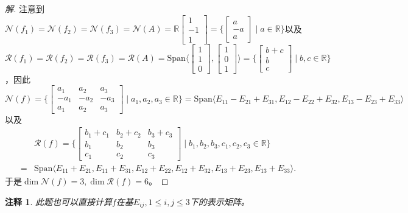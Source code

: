 \documentclass[UTF8]{ctexart}
\newtheorem{rmk}[thm]{注释}
\begin{document}
\begin{proof}[解]
注意到$\mathcal{N}(f_1) = \mathcal{N}(f_2) = \mathcal{N}(f_3) = \mathcal{N}(A) = \mathbb{R}\begin{bmatrix} 
1 \\
-1 \\
1
\end{bmatrix} = \{\begin{bmatrix} 
a \\
-a \\
a
\end{bmatrix} \mid a \in \mathbb{R}\}$以及
$\mathcal{R}(f_1) = \mathcal{R}(f_2) = \mathcal{R}(f_3) = \mathcal{R}(A) = \mathrm{Span} \langle \begin{bmatrix} 
1 \\
1 \\
0
\end{bmatrix}, \begin{bmatrix} 
1 \\
0 \\
1
\end{bmatrix}\rangle = \{\begin{bmatrix} 
b+c \\
b \\
c
\end{bmatrix} \mid b,c \in \mathbb{R} \}$，因此
\[
\mathcal{N}(f) = \{
\begin{bmatrix} 
a_1 & a_2 & a_3\\
-a_1 & -a_2 & -a_3\\
a_1 & a_2 & a_3
\end{bmatrix} \mid a_1, a_2, a_3 \in \mathbb{R} \}= \mathrm{Span} \langle E_{11} - E_{21}+E_{31}, E_{12} - E_{22}+E_{32}, E_{13} - E_{23}+E_{33}\rangle
\]
以及
\begin{equation} \nonumber
\begin{split}
&\mathcal{R}(f) = \{
\begin{bmatrix} 
b_1+c_1 & b_2+c_2 & b_3+c_3\\
b_1 & b_2 & b_3\\
c_1 & c_2 & c_3
\end{bmatrix} \mid b_1, b_2, b_3, c_1, c_2, c_3 \in \mathbb{R}
\} \\
= &\mathrm{Span} \langle E_{11}+E_{21}, E_{11}+E_{31}, E_{12}+E_{22}, E_{12}+E_{32},E_{13}+E_{23}, E_{13}+E_{33}\rangle.
\end{split}
\end{equation}
于是$\dim \mathcal{N}(f) = 3, \dim \mathcal{R}(f) = 6$。
\end{proof}
\begin{rmk}
此题也可以直接计算$f$在基$E_{ij}, 1 \leq i,j \leq 3$下的表示矩阵。
\end{rmk}
\end{document}
